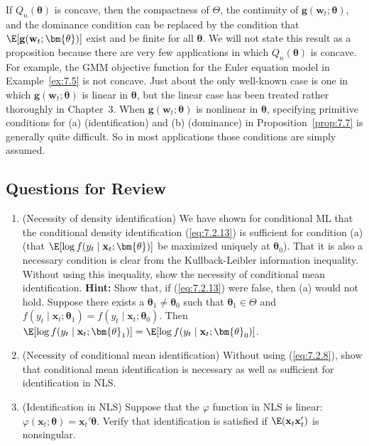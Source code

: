 If $Q_n(\bm{\theta})$ is concave, then the compactness of $\Theta$, the continuity of $\mathbf{g}(\mathbf{w}_t; \bm{\theta})$, and the dominance condition can be replaced by the condition that $\E[\mathbf{g}(\mathbf{w}_t; \bm{\theta})]$ exist and be finite for all $\bm{\theta}$. We will not state this result as a proposition because there are very few applications in which $Q_n(\bm{\theta})$ is concave. For example, the GMM objective function for the Euler equation model in Example~\ref{ex:7.5} is not concave. Just about the only well-known case is one in which $\mathbf{g}(\mathbf{w}_t; \bm{\theta})$ is linear in $\bm{\theta}$, but the linear case has been treated rather thoroughly in Chapter~3. When $\mathbf{g}(\mathbf{w}_t; \bm{\theta})$ is nonlinear in $\bm{\theta}$, specifying primitive conditions for (a) (identification) and (b) (dominance) in Proposition~\ref{prop:7.7} is generally quite difficult. So in most applications those conditions are simply assumed.

\subsection*{Questions for Review}

\begin{enumerate}
\item (Necessity of density identification) \enspace We have shown for conditional ML that the conditional density identification (\ref{eq:7.2.13}) is sufficient for condition (a) (that $\E[\log f(y_t \mid \mathbf{x}_t; \bm{\theta})]$ be maximized uniquely at $\bm{\theta}_0$). That it is also a necessary condition is clear from the Kullback-Leibler information inequality. Without using this inequality, show the necessity of conditional mean identification. \textbf{Hint:} Show that, if (\ref{eq:7.2.13}) were false, then (a) would not hold. Suppose there exists a $\bm{\theta}_1 \neq \bm{\theta}_0$ such that $\bm{\theta}_1 \in \Theta$ and $f(y_t \mid \mathbf{x}_t; \bm{\theta}_1) = f(y_t \mid \mathbf{x}_t; \bm{\theta}_0)$. Then $\E[\log f(y_t \mid \mathbf{x}_t; \bm{\theta}_1)] = \E[\log f(y_t \mid \mathbf{x}_t; \bm{\theta}_0)]$.

\item (Necessity of conditional mean identification) \enspace Without using (\ref{eq:7.2.8}), show that conditional mean identification is necessary as well as sufficient for identification in NLS.

\item (Identification in NLS) \enspace Suppose that the $\varphi$ function in NLS is linear: $\varphi(\mathbf{x}_t; \bm{\theta}) = \mathbf{x}_t' \bm{\theta}$. Verify that identification is satisfied if $\E(\mathbf{x}_t \mathbf{x}_t')$ is nonsingular.
\end{enumerate}
